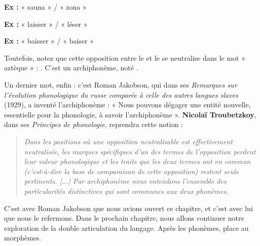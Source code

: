 \noindent\textbf{Ex :} « sauna » / « zona »

\noindent\textbf{Ex :} « laisser » / « léser »

\noindent\textbf{Ex :} « baisser » / « baiser »

Toutefois, notez que cette opposition entre le  et le  se neutralise dans le mot « aztèque » : \bipa{[astɛk]}. C’est un archiphonème, noté .

Un dernier mot, enfin : c’est Roman Jakobson, qui dans ses \textit{Remarques sur l’évolution phonologique du russe comparée à celle des autres langues slaves} (1929), a inventé l’archiphonème : « Nous pouvons dégager une entité nouvelle, essentielle pour la phonologie, à savoir l’archiphonème ». \textbf{Nicolaï Troubetzkoy}, dans ses \textit{Principes de phonologie}, reprendra cette notion :
\begin{quote}\small\itshape
Dans les positions où une opposition neutralisable est effectivement neutralisée, les marques spécifiques d’un des termes de l’opposition perdent leur valeur phonologique et les traits que les deux termes ont en commun (c’est-à-dire la base de comparaison de cette opposition) restent seuls pertinents. [...] Par archiphonème nous entendons l’ensemble des particularités distinctives qui sont communes aux deux phonèmes.
\end{quote}
C’est avec Roman Jakobson que nous avions ouvert ce chapitre, et c’est avec lui que nous le refermons. Dans le prochain chapitre, nous allons continuer notre exploration de la double articulation du langage. Après les phonèmes, place au morphèmes.

